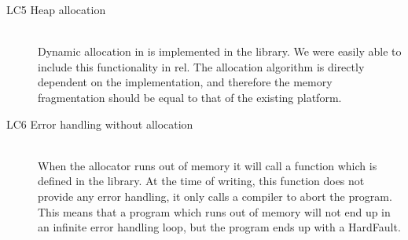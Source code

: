 \begin{description}
\item [LC5 Heap allocation] \hfill \\
  Dynamic allocation in {\rust} is implemented in the  library.
  We were easily able to include this functionality in \gls{rel}.
  The allocation algorithm is directly dependent on the   implementation, and therefore the memory fragmentation should be equal to that of the existing {\C} platform.

\item [LC6 Error handling without allocation] \hfill \\
  When the {\rust} allocator runs out of memory it will call a function which is defined in the  library.
  At the time of writing, this function does not provide any error handling, it only calls a compiler  to abort the program.
  This means that a {\rust} program which runs out of memory will not end up in an infinite error handling loop, but the program ends up with a HardFault.

\end{description}
